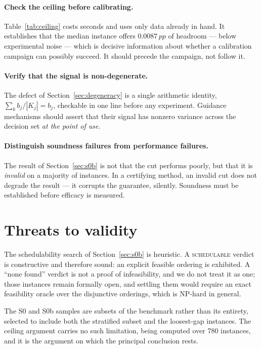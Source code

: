 \documentclass[11pt,a4paper]{article}
\newcommand{\Kj}{\ensuremath{K_j}}
\newcommand{\pp}{\,pp}
\begin{document}
\paragraph{Check the ceiling before calibrating.}
Table~\ref{tab:ceiling} costs seconds and uses only data already in hand. It
establishes that the median instance offers $0.0087\pp$ of headroom --- below
experimental noise --- which is decisive information about whether a calibration
campaign can possibly succeed. It should precede the campaign, not follow it.

\paragraph{Verify that the signal is non-degenerate.}
The defect of Section~\ref{sec:degeneracy} is a single arithmetic identity,
$\sum_k b_j/|\Kj|=b_j$, checkable in one line before any experiment. Guidance
mechanisms should assert that their signal has nonzero variance across the
decision set \emph{at the point of use}.

\paragraph{Distinguish soundness failures from performance failures.}
The result of Section~\ref{sec:s0b} is not that the cut performs poorly, but that
it is \emph{invalid} on a majority of instances. In a certifying method, an
invalid cut does not degrade the result --- it corrupts the guarantee, silently.
Soundness must be established before efficacy is measured.

\section{Threats to validity}\label{sec:threats}

The schedulability search of Section~\ref{sec:s0b} is heuristic. A
\textsc{schedulable} verdict is constructive and therefore sound: an explicit
feasible ordering is exhibited. A ``none found'' verdict is not a proof of
infeasibility, and we do not treat it as one; those instances remain formally
open, and settling them would require an exact feasibility oracle over the
disjunctive orderings, which is NP-hard in general.

The S0 and S0b samples are subsets of the benchmark rather than its entirety,
selected to include both the stratified subset and the loosest-gap instances. The
ceiling argument carries no such limitation, being computed over 780 instances,
and it is the argument on which the principal conclusion rests.
\end{document}

